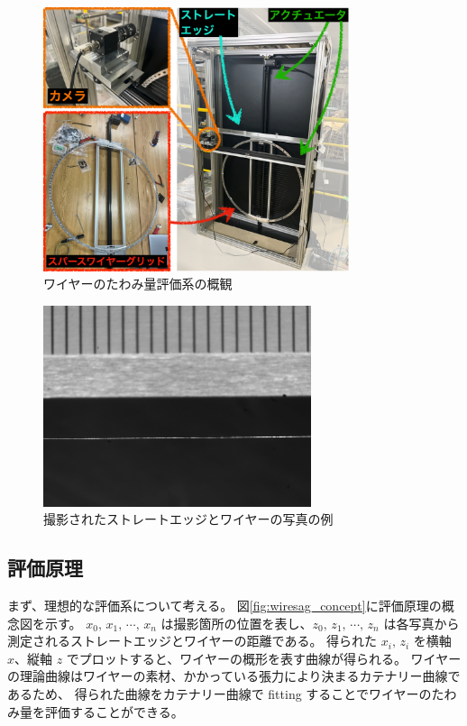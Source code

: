 \documentclass[../../main.tex]{subfiles}
\begin{document}
\begin{figure}[H]
    \centering
    \includegraphics[width=0.8\textwidth]{wiresag/wiresag_system.pdf}
    \caption{ワイヤーのたわみ量評価系の概観}
    \label{fig:wiresag_system}
\end{figure}

\begin{figure}[H]
    \centering
    \includegraphics[width=0.7\textwidth]{wiresag/20241219_UHF_0_wire23_x467_gray.png}
    \caption{撮影されたストレートエッジとワイヤーの写真の例}
    \label{fig:wiresag_picture}    
\end{figure}

\subsection{評価原理}
\label{subsec:wiresag_principle}
まず、理想的な評価系について考える。
図\ref{fig:wiresag_concept}に評価原理の概念図を示す。
$x_{0},\,x_{1},\,\cdots,\,x_{n}$ は撮影箇所の位置を表し、$z_{0},\,z_{1},\,\cdots,\,z_{n}$ は各写真から測定されるストレートエッジとワイヤーの距離である。
得られた $x_{i},\,z_{i}$ を横軸 $x$、縦軸 $z$ でプロットすると、ワイヤーの概形を表す曲線が得られる。
ワイヤーの理論曲線はワイヤーの素材、かかっている張力により決まるカテナリー曲線であるため、
得られた曲線をカテナリー曲線で fitting することでワイヤーのたわみ量を評価することができる。
\end{document}
